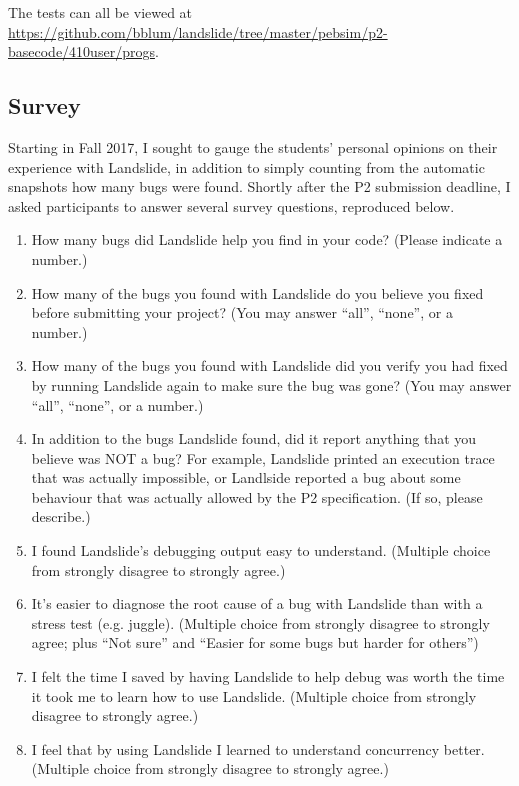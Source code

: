 \noindent The tests can all be viewed at \url{https://github.com/bblum/landslide/tree/master/pebsim/p2-basecode/410user/progs}.

\subsection{Survey}
\label{sec:education-survey-pebbles}

Starting in Fall 2017, I sought to gauge the students' personal opinions on their experience with Landslide,
in addition to simply counting
from the automatic snapshots
how many bugs were found.
Shortly after the P2 submission deadline,
I asked participants to answer several survey questions, reproduced below.

\begin{enumerate}
	\item How many bugs did Landslide help you find in your code? (Please indicate a number.)
	\item How many of the bugs you found with Landslide do you believe you fixed before submitting your project? (You may answer ``all'', ``none'', or a number.)
	\item How many of the bugs you found with Landslide did you verify you had fixed by running Landslide again to make sure the bug was gone? (You may answer ``all'', ``none'', or a number.)
	\item In addition to the bugs Landslide found, did it report anything that you believe was NOT a bug? For example, Landslide printed an execution trace that was actually impossible, or Landlside reported a bug about some behaviour that was actually allowed by the P2 specification. (If so, please describe.)
	\item I found Landslide's debugging output easy to understand.
		(Multiple choice from strongly disagree to strongly agree.)
	\item It's easier to diagnose the root cause of a bug with Landslide than with a stress test (e.g. juggle).
		(Multiple choice from strongly disagree to strongly agree; plus ``Not sure'' and ``Easier for some bugs but harder for others'')
	\item I felt the time I saved by having Landslide to help debug was worth the time it took me to learn how to use Landslide.
		(Multiple choice from strongly disagree to strongly agree.)
	\item I feel that by using Landslide I learned to understand concurrency better.
		(Multiple choice from strongly disagree to strongly agree.)

\end{enumerate}
